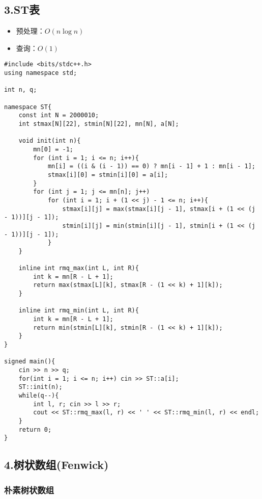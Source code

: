 \documentclass[]{article}
\providecommand{\tightlist}{%
  \setlength{\itemsep}{0pt}\setlength{\parskip}{0pt}}
\begin{document}
\hypertarget{stux8868}{%
\subsection{3.ST表}\label{stux8868}}

\begin{itemize}
\tightlist
\item
  预处理：\(O(n \log n)\)
\item
  查询：\(O(1)\)
\end{itemize}

\begin{verbatim}
#include <bits/stdc++.h>
using namespace std;

int n, q;

namespace ST{
    const int N = 2000010;
    int stmax[N][22], stmin[N][22], mn[N], a[N];

    void init(int n){
        mn[0] = -1;
        for (int i = 1; i <= n; i++){
            mn[i] = ((i & (i - 1)) == 0) ? mn[i - 1] + 1 : mn[i - 1];
            stmax[i][0] = stmin[i][0] = a[i];
        }
        for (int j = 1; j <= mn[n]; j++)
            for (int i = 1; i + (1 << j) - 1 <= n; i++){
                stmax[i][j] = max(stmax[i][j - 1], stmax[i + (1 << (j - 1))][j - 1]);
                stmin[i][j] = min(stmin[i][j - 1], stmin[i + (1 << (j - 1))][j - 1]);
            }
    }

    inline int rmq_max(int L, int R){
        int k = mn[R - L + 1];
        return max(stmax[L][k], stmax[R - (1 << k) + 1][k]);
    }

    inline int rmq_min(int L, int R){
        int k = mn[R - L + 1];
        return min(stmin[L][k], stmin[R - (1 << k) + 1][k]);
    }
}

signed main(){
    cin >> n >> q;
    for(int i = 1; i <= n; i++) cin >> ST::a[i];
    ST::init(n);
    while(q--){
        int l, r; cin >> l >> r;
        cout << ST::rmq_max(l, r) << ' ' << ST::rmq_min(l, r) << endl;
    }
    return 0;
}
\end{verbatim}

\hypertarget{ux6811ux72b6ux6570ux7ec4fenwick}{%
\subsection{4.树状数组(Fenwick)}\label{ux6811ux72b6ux6570ux7ec4fenwick}}

\hypertarget{ux6734ux7d20ux6811ux72b6ux6570ux7ec4}{%
\subsubsection{朴素树状数组}\label{ux6734ux7d20ux6811ux72b6ux6570ux7ec4}}
\end{document}

